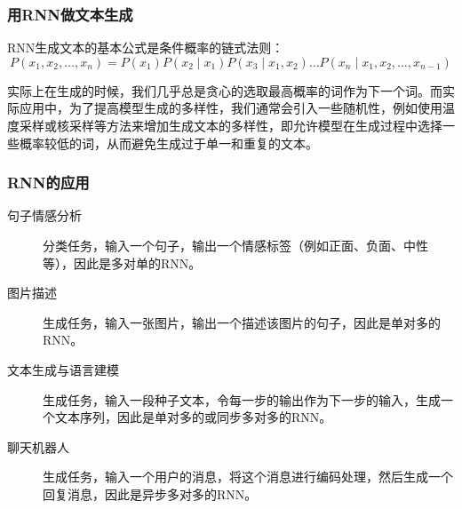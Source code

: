 \documentclass[aspectratio=1610]{ctexbeamer}
\begin{document}
\begin{frame}
    \frametitle{用RNN做文本生成}

    RNN生成文本的基本公式是条件概率的链式法则：
\begin{equation}
P(x_1, x_2, \ldots, x_n) = P(x_1) P(x_2  \mid  x_1) P(x_3  \mid  x_1, x_2) \ldots P(x_n  \mid  x_1, x_2, \ldots, x_{n-1})
\end{equation}

    实际上在生成的时候，我们几乎总是贪心的选取最高概率的词作为下一个词。而实际应用中，为了提高模型生成的多样性，我们通常会引入一些随机性，例如使用温度采样或核采样等方法来增加生成文本的多样性，即允许模型在生成过程中选择一些概率较低的词，从而避免生成过于单一和重复的文本。

\end{frame}

\begin{frame}
    \frametitle{RNN的应用}

    \begin{description}
        \item[句子情感分析] 分类任务，输入一个句子，输出一个情感标签（例如正面、负面、中性等），因此是多对单的RNN。
        \item[图片描述] 生成任务，输入一张图片，输出一个描述该图片的句子，因此是单对多的RNN。
        \item[文本生成与语言建模] 生成任务，输入一段种子文本，令每一步的输出作为下一步的输入，生成一个文本序列，因此是单对多的或同步多对多的RNN。
        \item[聊天机器人] 生成任务，输入一个用户的消息，将这个消息进行编码处理，然后生成一个回复消息，因此是异步多对多的RNN。
    \end{description}

\end{frame}
\end{document}
